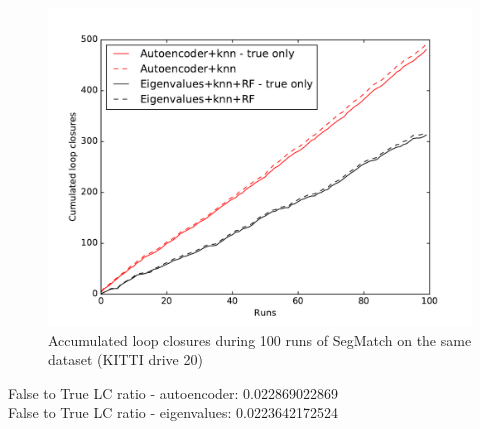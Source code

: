 \begin{figure}
  \centering
  \includegraphics[width=5.2in]{images/kitti20performance.pdf}
  \caption{Accumulated loop closures during 100 runs of SegMatch on the same dataset (KITTI drive 20)}
  \label{fig:kitti20-performance}
\end{figure}

False to True LC ratio - autoencoder: 0.022869022869\\
False to True LC ratio - eigenvalues: 0.0223642172524\\

